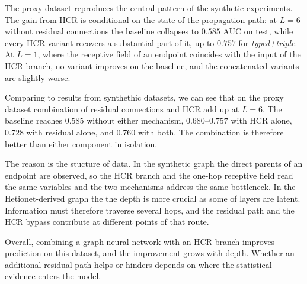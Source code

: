 The proxy dataset reproduces the central pattern of the synthetic experiments.
The gain from HCR is conditional on the state of the propagation path: at $L=6$ without
residual connections the baseline collapses to $0.585$ AUC on test, while every
HCR variant recovers a substantial part of it, up to $0.757$ for
\emph{typed+triple}. At $L=1$, where the receptive field of an endpoint
coincides with the input of the HCR branch, no variant improves on the
baseline, and the concatenated variants are slightly worse.

Comparing to results from synthethic datasets, we can see that on the proxy dataset combination of residual connections and 
HCR add up at $L=6$. The baseline
reaches $0.585$ without either mechanism, $0.680$--$0.757$ with HCR alone,
$0.728$ with residual alone, and $0.760$ with both. The combination is
therefore better than either component in isolation.

The reason is the stucture of data. In the synthetic graph the direct
parents of an endpoint are observed, so the HCR branch and the one-hop
receptive field read the same variables and the two mechanisms address the same
bottleneck. In the Hetionet-derived graph the the depth is more crucial as some of layers are latent. Information must
therefore traverse several hops, and the residual path and the HCR bypass
contribute at different points of that route. 

Overall, combining a graph neural network with an HCR branch improves
prediction on this dataset, and the improvement grows with depth. Whether an
additional residual path helps or hinders depends on where the statistical
evidence enters the model.


